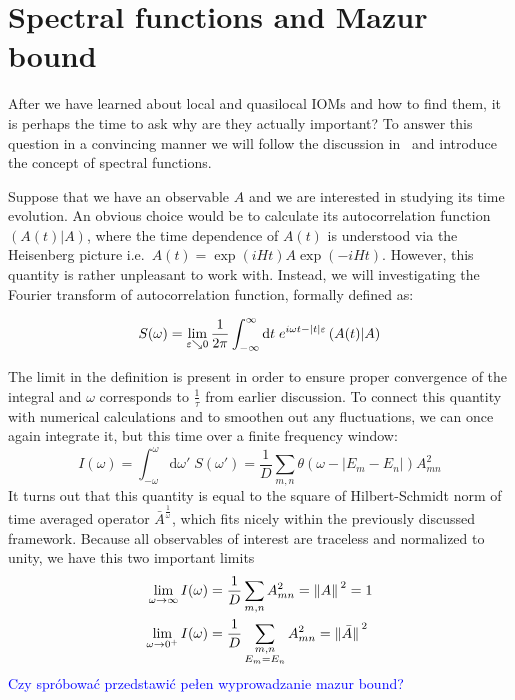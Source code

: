 
\section{Spectral functions and Mazur bound\label{sec:spectral function}}
After we have learned about local and quasilocal IOMs and how to find them, it is perhaps the 
time to ask why are they actually important? To answer this question in a convincing manner we 
will follow the discussion in~\textcite{Vidmar2021} and introduce the concept of spectral
functions. 

Suppose that we have an observable \(A\) and we are interested in studying its time
evolution. An obvious choice would be to calculate its autocorrelation function
\((A(t)|A)\), where the time dependence of \(A(t)\) is understood
via the Heisenberg picture i.e.\ \(A(t) = \exp\left(i H t\right) A
\exp\left(-i H t\right)\). However, this quantity is rather unpleasant to work with.
Instead, we will investigating the Fourier transform of autocorrelation function, formally
defined as:
\begin{definition}  
  \begin{equation*}
  S(\omega) =  \lim _{\varepsilon \searrow 0} \frac{1}{2 \pi} \int_{-\infty}^{\infty} \mathrm{d} t 
  \; e^{i \omega t-|t| \varepsilon}\left(A(t) \middle| A\right)
  \end{equation*}
  \label{def:spectral function}
\end{definition}
The limit in the definition is present in order to ensure proper convergence of the integral
and \(\omega{}\) corresponds to \(\frac{1}{\tau}\) from earlier discussion.
To connect this quantity with numerical calculations and to smoothen out any fluctuations, we
can once again integrate it, but this time over a finite frequency window:
\begin{equation}
  I(\omega) = \int_{-\omega}^{\omega} \mathrm{d}\omega' \; S(\omega') = 
  \frac{1}{D} \sum_{m,n} \theta\left(\omega - |E_m-E_n|\right) A_{mn}^2
\end{equation}
It turns out that this quantity is equal to the square of Hilbert-Schmidt norm of time
averaged operator \(\bar{A}^{\frac{1}{\omega}}\), which fits nicely within the previously
discussed framework. Because all observables of interest are traceless and
normalized to unity, we have this two important limits
\begin{align}
  \lim_{\omega \to \infty } I(\omega) &= \frac{1}{D}\sum_{m,n} A_{mn}^2 = \norm*{A}^2 = 1\\
  \lim_{\omega \to 0^+ } I(\omega) &= \frac{1}{D} \sum_{ \substack{m,n\\E_m=E_n} } A_{mn}^2 = \norm*{\bar{A}}^2
\end{align}
\textcolor{blue}{Czy spróbować przedstawić pełen wyprowadzanie mazur
bound?}

